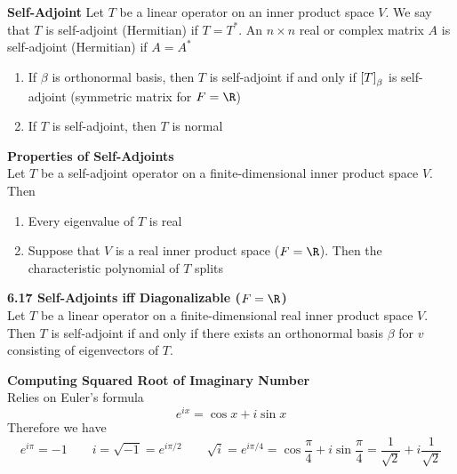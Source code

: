\documentclass[11pt]{article}
\begin{document}
\begin{defn*}
    \textbf{Self-Adjoint} Let $T$ be a linear operator on an inner product space $V$. We say that $T$ is self-adjoint (Hermitian) if $T = T^*$. An $n\times n$ real or complex matrix $A$ is self-adjoint (Hermitian) if $A=A^*$
    \begin{enumerate}
        \item If $\beta$ is orthonormal basis, then $T$ is self-adjoint if and only if $\left[ T \right]_{\beta}$ is self-adjoint (symmetric matrix for $F=\R$)
        \item If $T$ is self-adjoint, then $T$ is normal
    \end{enumerate}
\end{defn*}

\begin{lemma*}
    \textbf{Properties of Self-Adjoints} \\ 
    Let $T$ be a self-adjoint operator on a finite-dimensional inner product space $V$. Then 
    \begin{enumerate}
        \item Every eigenvalue of $T$ is real 
        \item Suppose that $V$ is a real inner product space ($F=\R$). Then the characteristic polynomial of $T$ splits
    \end{enumerate}
\end{lemma*}


\begin{theorem*}
    \textbf{6.17 Self-Adjoints iff Diagonalizable ($F=\R$)} \\
    Let $T$ be a linear operator on a finite-dimensional real inner product space $V$. Then $T$ is self-adjoint if and only if there exists an orthonormal basis $\beta$ for $v$ consisting of eigenvectors of $T$.
\end{theorem*}


\begin{defn*}
    \textbf{Computing Squared Root of Imaginary Number} \\
    Relies on Euler's formula 
    \[
        e^{ix}=\cos x + i\sin x 
    \]
    Therefore we have 
    \[
        e^{i\pi} = -1 \qquad 
        i = \sqrt{-1} = e^{i\pi/2} \qquad 
        \sqrt{i} = e^{i \pi / 4} = \cos \frac{\pi}{4} + i \sin \frac{\pi}{4} = \frac{1}{\sqrt{2}} + i \frac{1}{\sqrt{2}}
    \]
\end{defn*}
\end{document}
